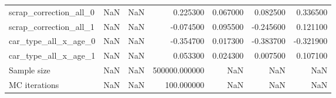 \begin{tabular}{lrlrrrr}
scrap_correction_all_0 & NaN & NaN & 0.225300 & 0.067000 & 0.082500 & 0.336500 \\
scrap_correction_all_1 & NaN & NaN & -0.074500 & 0.095500 & -0.245600 & 0.121100 \\
car_type_all_x_age_0 & NaN & NaN & -0.354700 & 0.017300 & -0.383700 & -0.321900 \\
car_type_all_x_age_1 & NaN & NaN & 0.053300 & 0.024300 & 0.007500 & 0.107100 \\
Sample size & NaN & NaN & 500000.000000 & NaN & NaN & NaN \\
MC iterations & NaN & NaN & 100.000000 & NaN & NaN & NaN \\
\bottomrule
\end{tabular}
